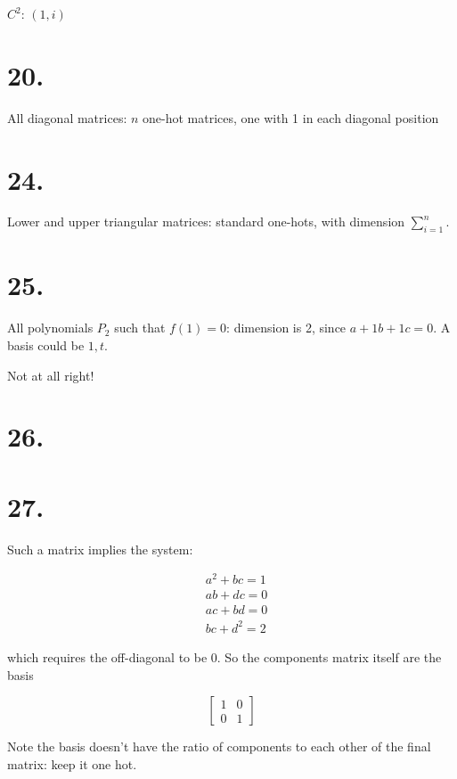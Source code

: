\documentclass[]{article}
\begin{document}
\(C^2\): \((1, i)\)

\hypertarget{section-19}{%
\section{20.}\label{section-19}}

All diagonal matrices: \(n\) one-hot matrices, one with 1 in each
diagonal position

\hypertarget{section-20}{%
\section{24.}\label{section-20}}

Lower and upper triangular matrices: standard one-hots, with dimension
\(\sum_{i=1}^n\).

\hypertarget{section-21}{%
\section{25.}\label{section-21}}

All polynomials \(P_2\) such that \(f(1)=0\): dimension is 2, since
\(a +1b + 1c=0\). A basis could be \(1, t\).

Not at all right!

\hypertarget{section-22}{%
\section{26.}\label{section-22}}

\hypertarget{section-23}{%
\section{27.}\label{section-23}}

Such a matrix implies the system:

\[\begin{aligned}&a^2+bc=1\\
&ab+dc=0\\
&ac+bd=0\\
&bc+d^2=2\end{aligned}\]

which requires the off-diagonal to be 0. So the components matrix itself
are the basis

\[\begin{bmatrix}1&0\\0&1\end{bmatrix}\]

Note the basis doesn't have the ratio of components to each other of the
final matrix: keep it one hot.
\end{document}
